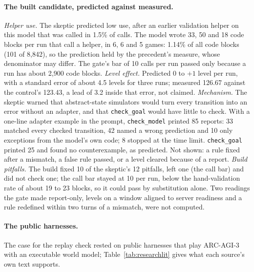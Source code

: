 \paragraph{The built candidate, predicted against measured.}
\textit{Helper use.} The skeptic predicted low use, after an earlier validation helper on this model that was called in 1.5\% of calls. %
The model wrote 33, 50 and 18 code blocks per run that call a helper, in 6, 6 and 5 games: 1.14\% of all code blocks (101 of 8,842), so the prediction held by the precedent's measure, whose denominator may differ. The gate's bar of 10 calls per run passed only because a run has about 2,900 code blocks. %
\textit{Level effect.} Predicted 0 to $+1$ level per run, with a standard error of about 4.5 levels for three runs; measured 126.67 against the control's 123.43, a lead of 3.2 inside that error, not claimed. %
\textit{Mechanism.} The skeptic warned that abstract-state simulators would turn every transition into an error without an adapter, and that \texttt{check\_goal} would have little to check. %
With a one-line adapter example in the prompt, \texttt{check\_model} printed 85 reports: 33 matched every checked transition, 42 named a wrong prediction and 10 only exceptions from the model's own code; 8 stopped at the time limit. \texttt{check\_goal} printed 25 and found no counterexample, as predicted. %
Not shown: a rule fixed after a mismatch, a false rule passed, or a level cleared because of a report. %
\textit{Build pitfalls.} The build fixed 10 of the skeptic's 12 pitfalls, left one (the call bar) and did not check one; the call bar stayed at 10 per run, below the hand-validation rate of about 19 to 23 blocks, so it could pass by substitution alone. %
Two readings the gate made report-only, levels on a window aligned to server readiness and a rule redefined within two turns of a mismatch, were not computed. %

\paragraph{The public harnesses.}
The case for the replay check rested on public harnesses that play ARC-AGI-3 with an executable world model; Table~\ref{tab:researchlit} gives what each source's own text supports. %

